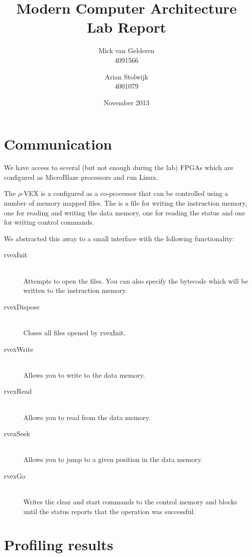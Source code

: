 \documentclass{article}
\title{Modern Computer Architecture\\Lab Report}
\author{%
    Mick van Gelderen\\4091566
    \and
    Arian Stolwijk\\4001079
}
\date{November 2013}
\newcommand{\rvex}{\ensuremath{\rho}-VEX}
\begin{document}
\maketitle




\section{Communication}

We have access to several (but not enough during the lab) FPGAs which are
configured as MicroBlaze processors and run Linux.

The \rvex{} is a configured as a co-processor that can be controlled using a
number of memory mapped files. The is a file for writing the instruction
memory, one for reading and writing the data memory, one for reading the status
and one for writing control commands.

We abstracted this away to a small interface with the following functionality:

\begin{description}
    \item[rvexInit] \hfill \\
        Attempts to open the files. You can also specify the bytecode which
        will be written to the instruction memory.
    \item[rvexDispose] \hfill \\
        Closes all files opened by rvexInit.
    \item[rvexWrite] \hfill \\
        Allows you to write to the data memory.
    \item[rvexRead] \hfill \\
        Allows you to read from the data memory.
    \item[rvexSeek] \hfill \\
        Allows you to jump to a given position in the data memory.
    \item[rvexGo] \hfill \\
        Writes the clear and start commands to the control memory and blocks
        until the status reports that the operation was successful.
\end{description}

\section{Profiling results}
\end{document}
